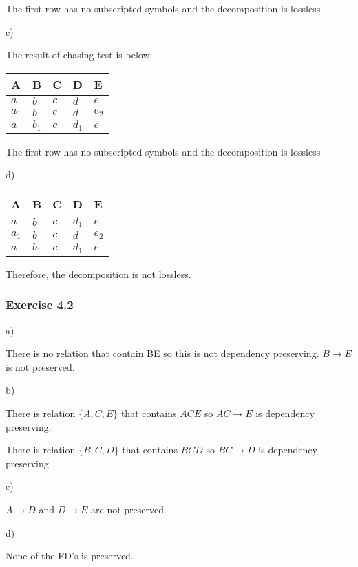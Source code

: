 \documentclass[../../main.tex]{subfiles}
\begin{document}
The first row has no subscripted symbols and the decomposition
is lossless

c)

The result of chasing test is below:

\begin{table}[H]
  \centering
  \begin{tabular}{@{}lllll@{}}
  \toprule
  A & B & C & D & E \\ \midrule
  $a$     & $b$      & $c$ & $d$     & $e$  \\
  $a_{1}$ & $b$      & $c$ & $d$     & $e_{2}$  \\
  $a$     & $b_{1}$  & $c$ & $d_{1}$ & $e$      \\ \bottomrule
  \end{tabular}
\end{table}

The first row has no subscripted symbols and the decomposition
is lossless

d)

\begin{table}[H]
  \centering
  \begin{tabular}{@{}lllll@{}}
  \toprule
  A & B & C & D & E \\ \midrule
  $a$     & $b$      & $c$ & $d_{1}$ & $e$  \\
  $a_{1}$ & $b$      & $c$ & $d$     & $e_{2}$  \\
  $a$     & $b_{1}$  & $c$ & $d_{1}$ & $e$      \\ \bottomrule
  \end{tabular}
\end{table}

Therefore, the decomposition is not lossless.

\subsubsection*{Exercise 4.2}

a)

There is no relation that contain BE so this is not dependency
preserving. $B \to E$ is not preserved.

b)

There is relation $\{A,C,E\}$ that contains $ACE$ so $AC \to E$
is dependency preserving.

There is relation $\{B,C,D\}$ that contains $BCD$ so $BC \to D$
is dependency preserving.

c)

$A \to D$ and $D \to E$ are not preserved.

d)

None of the FD's is preserved.
\end{document}
